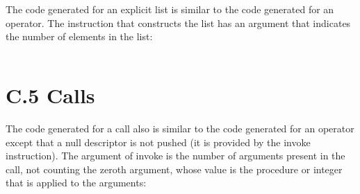 The code generated for an explicit list is similar to the code
generated for an operator. The instruction that constructs the list
has an argument that indicates the number of elements in the list:

\begin{center}
\tabletail{}
\tablelasttail{}
\begin{supertabular}{|m{1.9073598in}|m{2.75596in}|}

\end{supertabular}
\end{center}


\section[C.5 Calls]{C.5 Calls}

The code generated for a call also is similar to the code generated
for an operator except that a null descriptor is not pushed (it is
provided by the invoke instruction). The argument of invoke is the
number of arguments present in the call, not counting the zeroth
argument, whose value is the procedure or integer that is applied to
the arguments:

\begin{center}
\tabletail{}
\tablelasttail{}
\begin{supertabular}{|m{1.9073598in}|m{2.75596in}|}

\end{supertabular}
\end{center}

